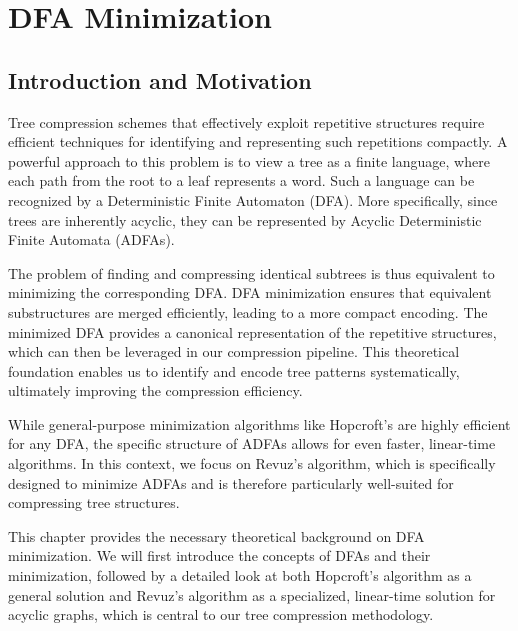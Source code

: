 \chapter{DFA Minimization} \label{chp:hopcroft}

\section{Introduction and Motivation}
Tree compression schemes that effectively exploit repetitive structures require efficient techniques for identifying and representing such repetitions compactly. A powerful approach to this problem is to view a tree as a finite language, where each path from the root to a leaf represents a word. Such a language can be recognized by a Deterministic Finite Automaton (DFA). More specifically, since trees are inherently acyclic, they can be represented by Acyclic Deterministic Finite Automata (ADFAs).

The problem of finding and compressing identical subtrees is thus equivalent to minimizing the corresponding DFA. DFA minimization ensures that equivalent substructures are merged efficiently, leading to a more compact encoding. The minimized DFA provides a canonical representation of the repetitive structures, which can then be leveraged in our compression pipeline. This theoretical foundation enables us to identify and encode tree patterns systematically, ultimately improving the compression efficiency.

While general-purpose minimization algorithms like Hopcroft's are highly efficient for any DFA, the specific structure of ADFAs allows for even faster, linear-time algorithms. In this context, we focus on Revuz's algorithm, which is specifically designed to minimize ADFAs and is therefore particularly well-suited for compressing tree structures.

This chapter provides the necessary theoretical background on DFA minimization. We will first introduce the concepts of DFAs and their minimization, followed by a detailed look at both Hopcroft's algorithm as a general solution and Revuz's algorithm as a specialized, linear-time solution for acyclic graphs, which is central to our tree compression methodology.

